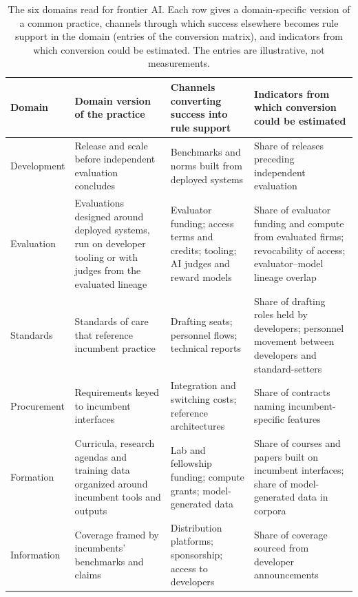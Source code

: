\documentclass[letterpaper]{article} %
\theoremstyle{definition}
\begin{document}
\begin{table}[t]
\centering
\small
\setlength{\tabcolsep}{4pt}
\begin{tabular}{@{}>{\raggedright\arraybackslash}p{1.75cm}>{\raggedright\arraybackslash}p{4.35cm}>{\raggedright\arraybackslash}p{5.0cm}>{\raggedright\arraybackslash}p{5.4cm}@{}}
\toprule
Domain & Domain version of the practice & Channels converting success into rule support & Indicators from which conversion could be estimated \\
\midrule
Development & Release and scale before independent evaluation concludes & Benchmarks and norms built from deployed systems & Share of releases preceding independent evaluation \\
Evaluation & Evaluations designed around deployed systems, run on developer tooling or with judges from the evaluated lineage & Evaluator funding; access terms and credits; tooling; AI judges and reward models & Share of evaluator funding and compute from evaluated firms; revocability of access; evaluator--model lineage overlap \\
Standards & Standards of care that reference incumbent practice & Drafting seats; personnel flows; technical reports & Share of drafting roles held by developers; personnel movement between developers and standard-setters \\
Procurement & Requirements keyed to incumbent interfaces & Integration and switching costs; reference architectures & Share of contracts naming incumbent-specific features \\
Formation & Curricula, research agendas and training data organized around incumbent tools and outputs & Lab and fellowship funding; compute grants; model-generated data & Share of courses and papers built on incumbent interfaces; share of model-generated data in corpora \\
Information & Coverage framed by incumbents' benchmarks and claims & Distribution platforms; sponsorship; access to developers & Share of coverage sourced from developer announcements \\
\bottomrule
\end{tabular}
\caption{The six domains read for frontier AI. Each row gives a domain-specific version of a common practice, channels through which success elsewhere becomes rule support in the domain (entries of the conversion matrix), and indicators from which conversion could be estimated. The entries are illustrative, not measurements.}
\label{tab:domains}
\end{table}
\end{document}
